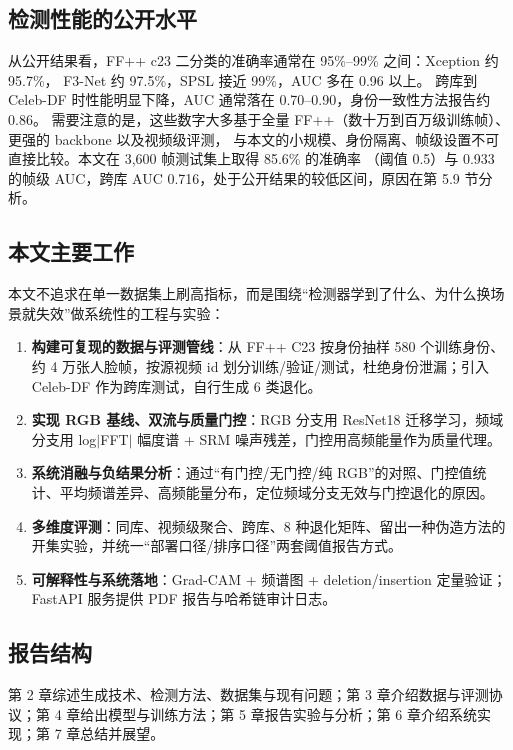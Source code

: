 \subsection{检测性能的公开水平}

从公开结果看，FF++ c23 二分类的准确率通常在 95\%--99\% 之间：Xception 约 95.7\%\cite{rossler2019ffpp}，
F3-Net 约 97.5\%\cite{qian2020f3net}，SPSL 接近 99\%\cite{liu2021spsl}，AUC 多在 0.96 以上。
跨库到 Celeb-DF 时性能明显下降，AUC 通常落在 0.70--0.90，身份一致性方法报告约 0.86\cite{dong2022ict}。
需要注意的是，这些数字大多基于全量 FF++（数十万到百万级训练帧）、更强的 backbone 以及视频级评测，
与本文的小规模、身份隔离、帧级设置不可直接比较。本文在 3,600 帧测试集上取得 85.6\% 的准确率
（阈值 0.5）与 0.933 的帧级 AUC，跨库 AUC 0.716，处于公开结果的较低区间，原因在第 5.9 节分析。

\subsection{本文主要工作}

本文不追求在单一数据集上刷高指标，而是围绕“检测器学到了什么、为什么换场景就失效”做系统性的工程与实验：

\begin{enumerate}
  \item \textbf{构建可复现的数据与评测管线}：从 FF++ C23 按身份抽样 580 个训练身份、约 4 万张人脸帧，按源视频 id 划分训练/验证/测试，杜绝身份泄漏；引入 Celeb-DF 作为跨库测试，自行生成 6 类退化。
  \item \textbf{实现 RGB 基线、双流与质量门控}：RGB 分支用 ResNet18 迁移学习，频域分支用 log$|$FFT$|$ 幅度谱 + SRM 噪声残差，门控用高频能量作为质量代理。
  \item \textbf{系统消融与负结果分析}：通过“有门控/无门控/纯 RGB”的对照、门控值统计、平均频谱差异、高频能量分布，定位频域分支无效与门控退化的原因。
  \item \textbf{多维度评测}：同库、视频级聚合、跨库、8 种退化矩阵、留出一种伪造方法的开集实验，并统一“部署口径/排序口径”两套阈值报告方式。
  \item \textbf{可解释性与系统落地}：Grad-CAM + 频谱图 + deletion/insertion 定量验证；FastAPI 服务提供 PDF 报告与哈希链审计日志。
\end{enumerate}

\subsection{报告结构}

第 2 章综述生成技术、检测方法、数据集与现有问题；第 3 章介绍数据与评测协议；第 4 章给出模型与训练方法；第 5 章报告实验与分析；第 6 章介绍系统实现；第 7 章总结并展望。
